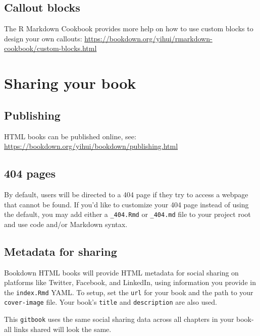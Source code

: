 \documentclass[
]{book}
\theoremstyle{definition}
\theoremstyle{definition}
\theoremstyle{definition}
\theoremstyle{definition}
\theoremstyle{remark}
\begin{document}
\hypertarget{callout-blocks}{%
\section{Callout blocks}\label{callout-blocks}}

The R Markdown Cookbook provides more help on how to use custom blocks to design your own callouts: \url{https://bookdown.org/yihui/rmarkdown-cookbook/custom-blocks.html}

\hypertarget{sharing-your-book}{%
\chapter{Sharing your book}\label{sharing-your-book}}

\hypertarget{publishing}{%
\section{Publishing}\label{publishing}}

HTML books can be published online, see: \url{https://bookdown.org/yihui/bookdown/publishing.html}

\hypertarget{pages}{%
\section{404 pages}\label{pages}}

By default, users will be directed to a 404 page if they try to access a webpage that cannot be found. If you'd like to customize your 404 page instead of using the default, you may add either a \texttt{\_404.Rmd} or \texttt{\_404.md} file to your project root and use code and/or Markdown syntax.

\hypertarget{metadata-for-sharing}{%
\section{Metadata for sharing}\label{metadata-for-sharing}}

Bookdown HTML books will provide HTML metadata for social sharing on platforms like Twitter, Facebook, and LinkedIn, using information you provide in the \texttt{index.Rmd} YAML. To setup, set the \texttt{url} for your book and the path to your \texttt{cover-image} file. Your book's \texttt{title} and \texttt{description} are also used.

This \texttt{gitbook} uses the same social sharing data across all chapters in your book- all links shared will look the same.
\end{document}

